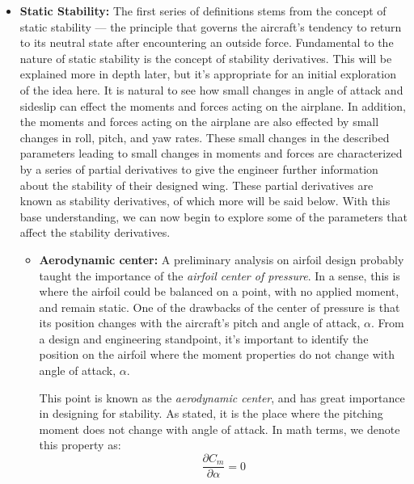 \documentclass{report}
\begin{document}
\begin{itemize}
    \item[] \textbf{Static Stability:}
    The first series of definitions stems from the concept of static stability --- the principle that governs the aircraft's tendency to return to its neutral state after encountering an outside force. Fundamental to the nature of static stability is the concept of stability derivatives. This will be explained more in depth later, but it's appropriate for an initial exploration of the idea here.
    It is natural to see how small changes in angle of attack and sideslip can effect the moments and forces acting on the airplane. In addition, the moments and forces acting on the airplane are also effected by small changes in roll, pitch, and yaw rates. These small changes in the described parameters leading to small changes in moments and forces are characterized by a series of partial derivatives to give the engineer further information about the stability of their designed wing.
    These partial derivatives are known as stability derivatives, of which more will be said below. With this base understanding, we can now begin to explore some of the parameters that affect the stability derivatives.
        \begin{itemize}
            \item[] \textbf{Aerodynamic center:} A preliminary analysis on airfoil design probably taught the importance of the \textit{airfoil center of pressure}. In a sense, this is where the airfoil could be balanced on a point, with no applied moment, and remain static.
            One of the drawbacks of the center of pressure is that its position changes with the aircraft's pitch and angle of attack, $\alpha$. From a design and engineering standpoint, it's important to identify the position on the airfoil where the moment properties do not change with angle of attack, $\alpha$.
            
            This point is known as the \textit{aerodynamic center}, and has great importance in designing for stability. As stated, it is the place where the pitching moment does not change with angle of attack. In math terms, we denote this property as:
            \begin{equation}\label{eq:aerodynamic_center_condition}
                \frac{\partial C_m}{\partial \alpha} = 0
            \end{equation}


\end{itemize}
\end{itemize}
\end{document}
